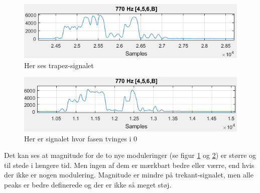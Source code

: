 \begin{figure}[h]
\centering
\includegraphics[scale=0.8]{Billeder/Steep10.PNG}
\caption{Her ses trapez-signalet}
\label{fig:steep10}
\end{figure} 

\begin{figure}[!h]
\centering
\includegraphics[scale=0.8]{Billeder/Smooth.PNG}
\caption{Her er signalet hvor fasen tvinges i 0}
\label{fig:smooth}
\end{figure} 

Det kan ses at magnitude for de to nye moduleringer (se figur \ref{fig:steep10} og \ref{fig:smooth}) er større og til stede i længere tid. Men ingen af dem er mærkbart bedre eller værre, end hvis der ikke er nogen modulering. Magnitude er mindre på trekant-signalet, men alle peaks er bedre definerede og der er ikke så meget støj.